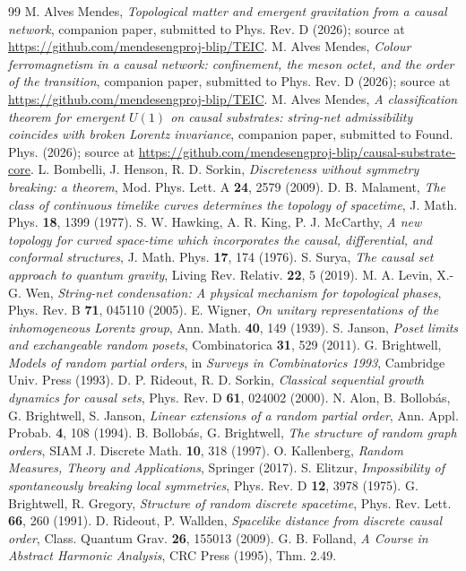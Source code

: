 \documentclass[aps,prd,reprint,nofootinbib,superscriptaddress,floatfix]{revtex4-2}
\theoremstyle{definition}
\begin{document}
\begin{thebibliography}{99}
 M. Alves Mendes, \emph{Topological matter and emergent
gravitation from a causal network}, companion paper, submitted to Phys. Rev. D (2026);
source at \url{https://github.com/mendesengproj-blip/TEIC}.
 M. Alves Mendes, \emph{Colour ferromagnetism in a causal network:
confinement, the meson octet, and the order of the transition}, companion paper,
submitted to Phys. Rev. D (2026); source at
\url{https://github.com/mendesengproj-blip/TEIC}.
 M. Alves Mendes, \emph{A classification theorem for emergent
$U(1)$ on causal substrates: string-net admissibility coincides with broken Lorentz
invariance}, companion paper, submitted to Found. Phys. (2026); source at
\url{https://github.com/mendesengproj-blip/causal-substrate-core}.
 L. Bombelli, J. Henson, R. D. Sorkin, \emph{Discreteness without
symmetry breaking: a theorem}, Mod. Phys. Lett. A \textbf{24}, 2579 (2009).
 D. B. Malament, \emph{The class of continuous timelike curves
determines the topology of spacetime}, J. Math. Phys. \textbf{18}, 1399 (1977).
 S. W. Hawking, A. R. King, P. J. McCarthy, \emph{A new topology for
curved space-time which incorporates the causal, differential, and conformal
structures}, J. Math. Phys. \textbf{17}, 174 (1976).
 S. Surya, \emph{The causal set approach to quantum gravity},
Living Rev. Relativ. \textbf{22}, 5 (2019).
 M. A. Levin, X.-G. Wen, \emph{String-net condensation: A physical
mechanism for topological phases}, Phys. Rev. B \textbf{71}, 045110 (2005).
 E. Wigner, \emph{On unitary representations of the inhomogeneous
Lorentz group}, Ann. Math. \textbf{40}, 149 (1939).
 S. Janson, \emph{Poset limits and exchangeable random posets},
Combinatorica \textbf{31}, 529 (2011).
 G. Brightwell, \emph{Models of random partial orders}, in
\emph{Surveys in Combinatorics 1993}, Cambridge Univ. Press (1993).
 D. P. Rideout, R. D. Sorkin, \emph{Classical sequential
growth dynamics for causal sets}, Phys. Rev. D \textbf{61}, 024002 (2000).
 N. Alon, B. Bollob\'as, G. Brightwell, S. Janson, \emph{Linear
extensions of a random partial order}, Ann. Appl. Probab. \textbf{4}, 108 (1994).
 B. Bollob\'as, G. Brightwell, \emph{The structure of
random graph orders}, SIAM J. Discrete Math. \textbf{10}, 318 (1997).
 O. Kallenberg, \emph{Random Measures, Theory and Applications},
Springer (2017).
 S. Elitzur, \emph{Impossibility of spontaneously breaking local
symmetries}, Phys. Rev. D \textbf{12}, 3978 (1975).
 G. Brightwell, R. Gregory, \emph{Structure of random
discrete spacetime}, Phys. Rev. Lett. \textbf{66}, 260 (1991).
 D. Rideout, P. Wallden, \emph{Spacelike distance from
discrete causal order}, Class. Quantum Grav. \textbf{26}, 155013 (2009).
 G. B. Folland, \emph{A Course in Abstract Harmonic Analysis},
CRC Press (1995), Thm. 2.49.
\end{thebibliography}
\end{document}
